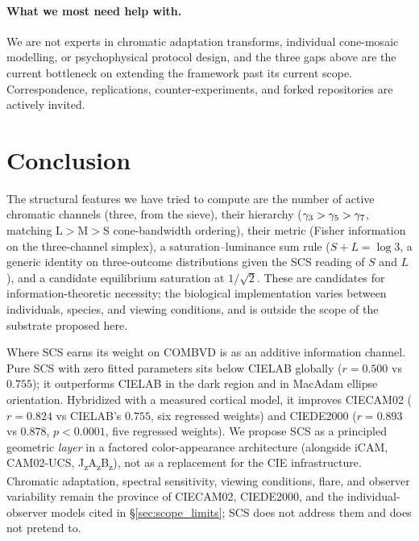 \documentclass[12pt,a4paper]{article}
\begin{document}
\paragraph{What we most need help with.}
We are not experts in chromatic adaptation transforms, individual
cone-mosaic modelling, or psychophysical protocol design, and the
three gaps above are the current bottleneck on extending the
framework past its current scope. Correspondence, replications,
counter-experiments, and forked repositories are actively invited.

\section{Conclusion}
\label{sec:conclusion}

The structural features we have tried to compute are the number of
active chromatic channels (three, from the sieve), their hierarchy
($\gamma_{3} > \gamma_{5} > \gamma_{7}$, matching L$>$M$>$S
cone-bandwidth ordering), their metric (Fisher information on the
three-channel simplex), a saturation--luminance sum rule
($S + L = \log 3$, a generic identity on three-outcome distributions
given the SCS reading of $S$ and $L$), and a candidate equilibrium
saturation at $1/\sqrt{2}$. These are candidates for
information-theoretic necessity; the biological implementation varies
between individuals, species, and viewing conditions, and is outside
the scope of the substrate proposed here.

Where SCS earns its weight on COMBVD is as an additive information
channel. Pure SCS with zero fitted parameters sits below CIELAB
globally ($r = 0.500$ vs $0.755$); it outperforms CIELAB in the dark
region and in MacAdam ellipse orientation. Hybridized with a measured
cortical model, it improves CIECAM02 ($r = 0.824$ vs CIELAB's
$0.755$, six regressed weights) and CIEDE2000 ($r = 0.893$ vs
$0.878$, $p < 0.0001$, five regressed weights). We propose SCS as a
principled geometric \emph{layer} in a factored color-appearance
architecture (alongside iCAM, CAM02-UCS, J\textsubscript{z}A\textsubscript{z}B\textsubscript{z}),
not as a replacement for the CIE infrastructure. Chromatic adaptation,
spectral sensitivity, viewing conditions, flare, and observer
variability remain the province of CIECAM02, CIEDE2000, and the
individual-observer models cited in \S\ref{sec:scope_limits}; SCS does
not address them and does not pretend to.
\end{document}
